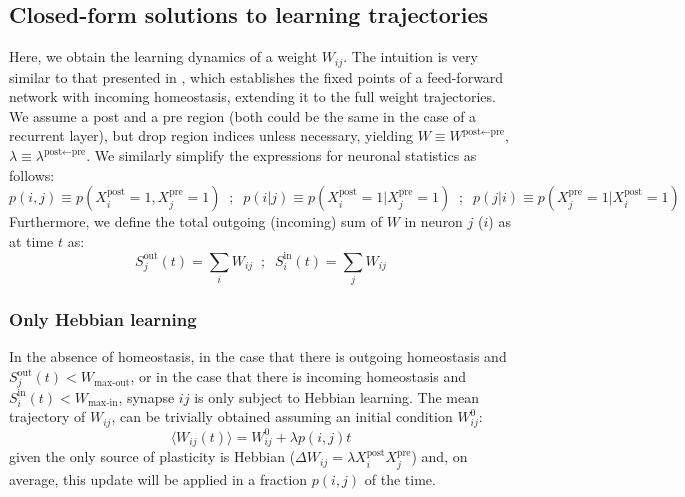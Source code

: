 \documentclass{article}
\begin{document}
\subsection*{Closed-form solutions to learning trajectories}
Here, we obtain the learning dynamics of a weight $W_{ij}$. The intuition is very similar to that presented in , which establishes the fixed points of a feed-forward network with incoming homeostasis, extending it to the full weight trajectories.
\newline\newline
We assume a post and a pre region (both could be the same in the case of a recurrent layer), but drop region indices unless necessary, yielding $W \equiv W^{\textrm{post}\leftarrow\textrm{pre}}$, $\lambda \equiv \lambda^{\textrm{post}\leftarrow\textrm{pre}}$. We similarly simplify the expressions for neuronal statistics as follows:
\begin{equation}
    p(i, j) \equiv p(X^\textrm{post}_i = 1 , X^\textrm{pre}_j = 1) \;\; ; \;\; p(i|j) \equiv p(X^\textrm{post}_i = 1 | X^\textrm{pre}_j = 1) \;\; ; \;\; p(j|i) \equiv p(X^\textrm{pre}_j = 1 | X^\textrm{post}_i = 1)
\end{equation}
Furthermore, we define the total outgoing (incoming) sum of $W$ in neuron $j$ ($i$) as at time $t$ as:
    \begin{equation}
    S^\textrm{out}_j(t) = \sum_i W_{ij} \;\; ; \;\; S^\textrm{in}_i(t) = \sum_j W_{ij}
\end{equation}
\subsubsection*{Only Hebbian learning}
In the absence of homeostasis, in the case that there is outgoing homeostasis and $S^\textrm{out}_j(t) < W_\textrm{max-out}$, or in the case that there is incoming homeostasis and $S^\textrm{in}_i(t) < W_\textrm{max-in}$, synapse $ij$ is only subject to Hebbian learning. The mean trajectory of $W_{ij}$, can be trivially obtained assuming an initial condition $W_{ij}^0$:
\begin{equation}
    \langle W_{ij}(t)\rangle = W_{ij}^0 + \lambda p(i, j) t
    \label{eq:hebbian_mean}
\end{equation}
given the only source of plasticity is Hebbian ($\Delta W_{ij} = \lambda X^\textrm{post}_iX^\textrm{pre}_j$) and, on average, this update will be applied in a fraction $p(i, j)$ of the time. 
\end{document}
